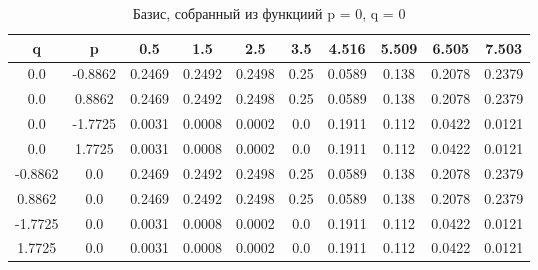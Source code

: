 \documentclass[a4paper,14pt]{extarticle}
\begin{document}
\begin{landscape}
\begin{table}[H]
\centering
\caption{Базис, собранный из функциий p = 0, q = 0}
\begin{tabular}{|c|c|*{8}{c}|}
\hline
q       & p       & 0.5    & 1.5    & 2.5    & 3.5  & 4.516  & 5.509 & 6.505  & 7.503  \\ 
\hline                                                                        
0.0     & -0.8862 & 0.2469 & 0.2492 & 0.2498 & 0.25 & 0.0589 & 0.138 & 0.2078 & 0.2379 \\ 
0.0     & 0.8862  & 0.2469 & 0.2492 & 0.2498 & 0.25 & 0.0589 & 0.138 & 0.2078 & 0.2379 \\ 
0.0     & -1.7725 & 0.0031 & 0.0008 & 0.0002 & 0.0  & 0.1911 & 0.112 & 0.0422 & 0.0121 \\ 
0.0     & 1.7725  & 0.0031 & 0.0008 & 0.0002 & 0.0  & 0.1911 & 0.112 & 0.0422 & 0.0121 \\ 
-0.8862 & 0.0     & 0.2469 & 0.2492 & 0.2498 & 0.25 & 0.0589 & 0.138 & 0.2078 & 0.2379 \\ 
0.8862  & 0.0     & 0.2469 & 0.2492 & 0.2498 & 0.25 & 0.0589 & 0.138 & 0.2078 & 0.2379 \\ 
-1.7725 & 0.0     & 0.0031 & 0.0008 & 0.0002 & 0.0  & 0.1911 & 0.112 & 0.0422 & 0.0121 \\ 
1.7725  & 0.0     & 0.0031 & 0.0008 & 0.0002 & 0.0  & 0.1911 & 0.112 & 0.0422 & 0.0121 \\ 
\hline
\end{tabular}
\end{table} 


\end{landscape}
\end{document}
